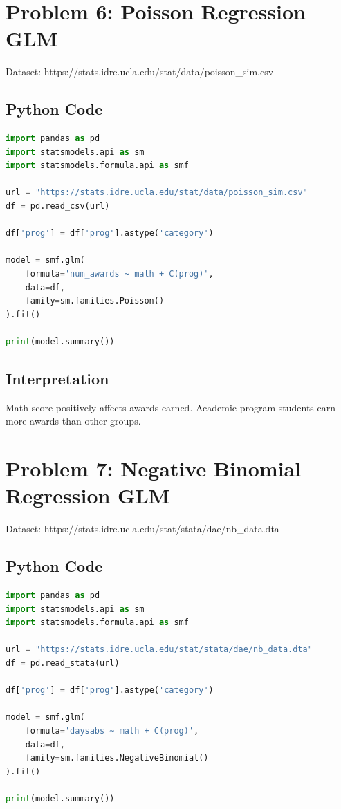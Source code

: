 \documentclass[12pt]{article}
\begin{document}
\newpage

\section*{Problem 6: Poisson Regression GLM}

Dataset:
https://stats.idre.ucla.edu/stat/data/poisson_sim.csv

\subsection*{Python Code}

\begin{lstlisting}[language=Python]
import pandas as pd
import statsmodels.api as sm
import statsmodels.formula.api as smf

url = "https://stats.idre.ucla.edu/stat/data/poisson_sim.csv"
df = pd.read_csv(url)

df['prog'] = df['prog'].astype('category')

model = smf.glm(
    formula='num_awards ~ math + C(prog)',
    data=df,
    family=sm.families.Poisson()
).fit()

print(model.summary())
\end{lstlisting}

\subsection*{Interpretation}

Math score positively affects awards earned.
Academic program students earn more awards than other groups.

\newpage

\section*{Problem 7: Negative Binomial Regression GLM}

Dataset:
https://stats.idre.ucla.edu/stat/stata/dae/nb_data.dta

\subsection*{Python Code}

\begin{lstlisting}[language=Python]
import pandas as pd
import statsmodels.api as sm
import statsmodels.formula.api as smf

url = "https://stats.idre.ucla.edu/stat/stata/dae/nb_data.dta"
df = pd.read_stata(url)

df['prog'] = df['prog'].astype('category')

model = smf.glm(
    formula='daysabs ~ math + C(prog)',
    data=df,
    family=sm.families.NegativeBinomial()
).fit()

print(model.summary())
\end{lstlisting}
\end{document}
